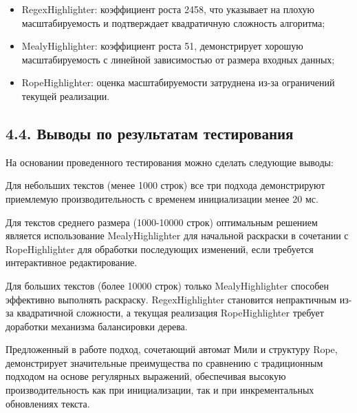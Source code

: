 \begin{itemize}
\item RegexHighlighter: коэффициент роста 2458, что указывает на плохую масштабируемость и подтверждает квадратичную сложность алгоритма;
\item MealyHighlighter: коэффициент роста 51, демонстрирует хорошую масштабируемость с линейной зависимостью от размера входных данных;
\item RopeHighlighter: оценка масштабируемости затруднена из-за ограничений текущей реализации.
\end{itemize}

\subsection*{4.4. Выводы по результатам тестирования}

На основании проведенного тестирования можно сделать следующие выводы:

Для небольших текстов (менее 1000 строк) все три подхода демонстрируют приемлемую производительность с временем инициализации менее 20 мс.

Для текстов среднего размера (1000-10000 строк) оптимальным решением является использование MealyHighlighter для начальной раскраски в сочетании с RopeHighlighter для обработки последующих изменений, если требуется интерактивное редактирование.

Для больших текстов (более 10000 строк) только MealyHighlighter способен эффективно выполнять раскраску. RegexHighlighter становится непрактичным из-за квадратичной сложности, а текущая реализация RopeHighlighter требует доработки механизма балансировки дерева.

Предложенный в работе подход, сочетающий автомат Мили и структуру Rope, демонстрирует значительные преимущества по сравнению с традиционным подходом на основе регулярных выражений, обеспечивая высокую производительность как при инициализации, так и при инкрементальных обновлениях текста. 